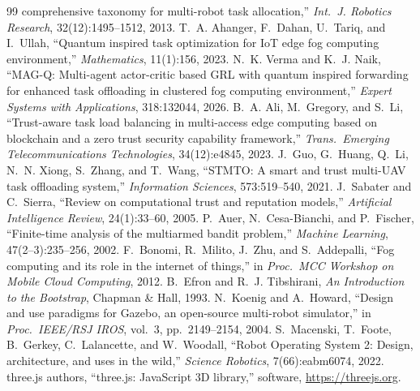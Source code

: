 \documentclass[11pt]{article}
\begin{document}
\begin{thebibliography}{99}
comprehensive taxonomy for multi-robot task allocation,'' \emph{Int.\ J.
Robotics Research}, 32(12):1495--1512, 2013.
 T.~A. Ahanger, F.~Dahan, U.~Tariq, and I.~Ullah,
``Quantum inspired task optimization for IoT edge fog computing
environment,'' \emph{Mathematics}, 11(1):156, 2023.
 N.~K. Verma and K.~J. Naik, ``MAG-Q: Multi-agent
actor-critic based GRL with quantum inspired forwarding for enhanced task
offloading in clustered fog computing environment,'' \emph{Expert Systems with
Applications}, 318:132044, 2026.
 B.~A. Ali, M.~Gregory, and S.~Li, ``Trust-aware task load
balancing in multi-access edge computing based on blockchain and a zero trust
security capability framework,'' \emph{Trans.\ Emerging Telecommunications
Technologies}, 34(12):e4845, 2023.
 J.~Guo, G.~Huang, Q.~Li, N.~N. Xiong, S.~Zhang, and T.~Wang,
``STMTO: A smart and trust multi-UAV task offloading system,''
\emph{Information Sciences}, 573:519--540, 2021.
 J.~Sabater and C.~Sierra, ``Review on computational
trust and reputation models,'' \emph{Artificial Intelligence Review},
24(1):33--60, 2005.
 P.~Auer, N.~Cesa-Bianchi, and P.~Fischer, ``Finite-time
analysis of the multiarmed bandit problem,'' \emph{Machine Learning},
47(2--3):235--256, 2002.
 F.~Bonomi, R.~Milito, J.~Zhu, and S.~Addepalli, ``Fog
computing and its role in the internet of things,'' in \emph{Proc.\ MCC
Workshop on Mobile Cloud Computing}, 2012.
 B.~Efron and R.~J. Tibshirani, \emph{An Introduction to
the Bootstrap}, Chapman \& Hall, 1993.
 N.~Koenig and A.~Howard, ``Design and use paradigms for
Gazebo, an open-source multi-robot simulator,'' in \emph{Proc.\ IEEE/RSJ
IROS}, vol.~3, pp.~2149--2154, 2004.
 S.~Macenski, T.~Foote, B.~Gerkey, C.~Lalancette, and
W.~Woodall, ``Robot Operating System 2: Design, architecture, and uses in the
wild,'' \emph{Science Robotics}, 7(66):eabm6074, 2022.
 three.js authors, ``three.js: JavaScript 3D library,''
software, \url{https://threejs.org}.
\end{thebibliography}
\end{document}

